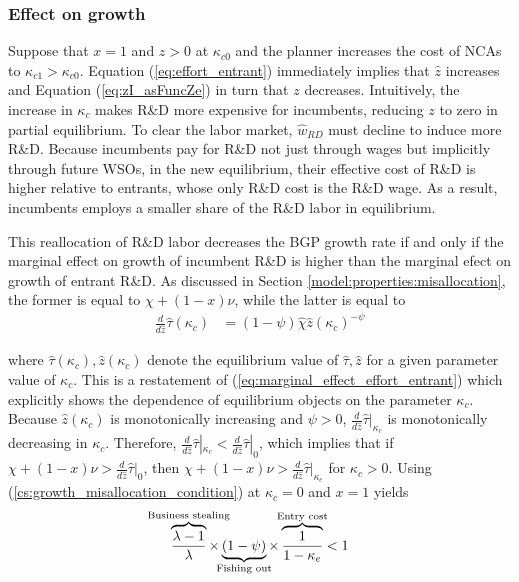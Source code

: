 \documentclass[11pt,english]{article}
\begin{document}
\subsubsection{Effect on growth}

Suppose that $x = 1$ and $z > 0$ at $\kappa_{c0}$ and the planner increases the cost of NCAs to $\kappa_{c1} > \kappa_{c0}$. Equation (\ref{eq:effort_entrant}) immediately implies that $\hat{z}$ increases and Equation (\ref{eq:zI_asFuncZe}) in turn that $z$ decreases. Intuitively, the increase in $\kappa_c$ makes R\&D more expensive for incumbents, reducing $z$ to zero in partial equilibrium. To clear the labor market, $\hat{w}_{RD}$ must decline to induce more R\&D. Because incumbents pay for R\&D not just through wages but implicitly through future WSOs, in the new equilibrium, their effective cost of R\&D is higher relative to entrants, whose only R\&D cost is the R\&D wage. As a result, incumbents employs a smaller share of the R\&D labor in equilibrium.

This reallocation of R\&D labor decreases the BGP growth rate if and only if the marginal effect on growth of incumbent R\&D is higher than the marginal efect on growth of entrant R\&D. As discussed in Section \ref{model:properties:misallocation}, the former is equal to $\chi + (1-x)\nu$, while the latter is equal to 
\begin{align}
\frac{d}{d\hat{z}} \hat{\tau}(\kappa_c) &= (1-\psi) \hat{\chi} \hat{z} (\kappa_c)^{-\psi} \label{eq:marginal_effect_effort_entrant_kappaC}
\end{align}

where $\hat{\tau}(\kappa_c), \hat{z}(\kappa_c)$ denote the equilibrium value of $\hat{\tau}, \hat{z}$ for a given parameter value of $\kappa_c$. This is a restatement of (\ref{eq:marginal_effect_effort_entrant}) which explicitly shows the dependence of equilibrium objects on the parameter $\kappa_c$. Because $\hat{z}(\kappa_c)$ is monotonically increasing and $\psi > 0$, $\frac{d}{d\hat{z}} \hat{\tau} |_{\kappa_c}$ is monotonically decreasing in $\kappa_c$. Therefore, $\frac{d}{d\hat{z}}\hat{\tau} |_{\kappa_c} < \frac{d}{d\hat{z}}\hat{\tau}|_0$, which implies that if $\chi + (1-x)\nu > \frac{d}{d\hat{z}} \hat{\tau} |_0$, then $\chi + (1-x)\nu > \frac{d}{d\hat{z}} \hat{\tau} |_{\kappa_c}$ for $\kappa_c > 0$. Using (\ref{cs:growth_misallocation_condition}) at $\kappa_c = 0$ and $x = 1$ yields
\begin{align} \overbrace{\frac{\lambda-1}{\lambda}}^{\mathclap{\text{Business stealing}}} \times \underbrace{(1-\psi)}_{\mathclap{\text{Fishing out}}} \times  \overbrace{\frac{1}{1-\kappa_{e}}}^{\mathclap{\text{Entry cost}}}< 1 \label{cs:growth_decreasing_condition}
\end{align}
\end{document}

